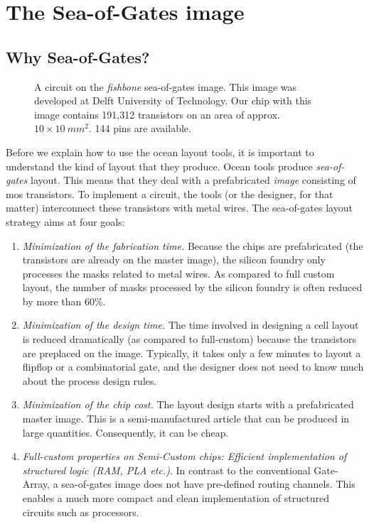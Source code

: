 
\chapter{The Sea-of-Gates image}
\label{s-fishstruct}
\section{Why Sea-of-Gates?}
\begin{figure}
\centerline{}
\caption{A circuit on the {\em fishbone}
sea-of-gates image. This image was developed
at Delft University of Technology. Our chip
with this image contains 191,312 transistors
on an area of approx. $10 \times 10 ~ mm^2$. 144
pins are available.}
\label{fishhotel}
\end{figure}

Before we explain how to use the {\sc ocean} layout tools, it is important to
understand the kind of layout that they produce. {\sc Ocean} tools produce {\sl
sea-of-gates} layout. This means that they deal with a prefabricated {\sl
image}  consisting of {\sc mos} transistors. To implement a
circuit, the tools (or the designer, for that matter) interconnect these
transistors with metal wires. The sea-of-gates layout strategy aims at four
goals:
\begin{enumerate}
\item {\sl Minimization of the fabrication time.}
Because the chips are prefabricated (the transistors are already on the master
image), the silicon foundry only processes the masks related to metal wires. As
compared to full custom layout, the number of masks processed by the silicon
foundry is often reduced by more than 60\%.
\item {\sl Minimization of the design time.}
The time involved in designing a cell layout is reduced dramatically (as
compared to full-custom) because the transistors are preplaced on the image.
Typically, it takes only a few minutes to layout a flipflop or a combinatorial
gate, and the designer does not need to know much about the process design
rules.
\item {\sl Minimization of the chip cost.}
The layout design starts with a prefabricated master image. This is a
semi-manufactured article that can be produced in large quantities.
Consequently, it can be cheap.
\item {\sl Full-custom properties on Semi-Custom chips: Efficient implementation 
of structured logic (RAM, PLA etc.)}. In contrast to the conventional
Gate-Array, a sea-of-gates image does not have pre-defined routing channels.
This enables a much more compact and clean implementation of structured
circuits such as processors.
\end{enumerate}

